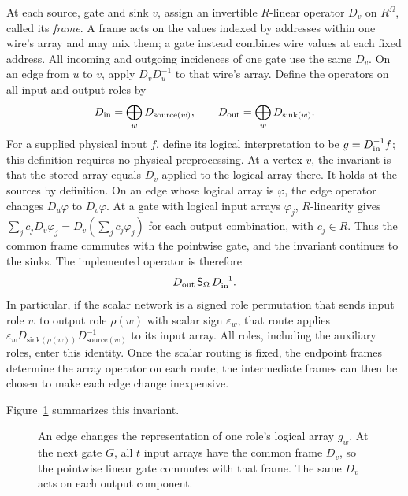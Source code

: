 \documentclass[11pt]{article}
\theoremstyle{definition}
\begin{document}
At each source, gate and sink $v$, assign an invertible $R$-linear operator
$D_v$ on $R^\Omega$, called its \emph{frame}.  A frame acts on the values
indexed by addresses within one wire's array and may mix them; a gate instead
combines wire values at each fixed address.  All incoming and outgoing
incidences of one gate use the same $D_v$.  On an edge from $u$ to $v$, apply
$D_vD_u^{-1}$ to that wire's array.  Define the operators on all input and
output roles by
\[
 D_{\rm in}=\bigoplus_w D_{\mathrm{source}(w)},\qquad
 D_{\rm out}=\bigoplus_w D_{\mathrm{sink}(w)}.
\]
For a supplied physical input $f$, define its logical interpretation to be
$g=D_{\rm in}^{-1}f$; this definition requires no physical preprocessing.
At a vertex $v$, the invariant is that the stored array equals $D_v$ applied
to the logical array there.  It holds at the sources by definition.  On an
edge whose logical array is $\varphi$, the edge operator changes $D_u\varphi$
to $D_v\varphi$.  At a gate with logical input arrays $\varphi_j$,
$R$-linearity gives
$\sum_j c_jD_v\varphi_j=D_v(\sum_j c_j\varphi_j)$ for each output combination, with
$c_j\in R$.  Thus the common frame commutes with the pointwise gate, and
the invariant continues to the sinks.  The implemented operator is therefore
\begin{equation}
 D_{\rm out}\,\mathsf S_\Omega\,D_{\rm in}^{-1}.
 \label{eq:common-frame-identity}
\end{equation}
In particular, if the scalar network is a signed role permutation that
sends input role $w$ to output role $\rho(w)$ with scalar sign
$\varepsilon_w$, that route applies
$\varepsilon_wD_{\mathrm{sink}(\rho(w))}
D_{\mathrm{source}(w)}^{-1}$ to its input array.  All roles, including
the auxiliary roles, enter this identity.  Once the scalar routing is fixed,
the endpoint frames determine the array operator on each route; the
intermediate frames can then be chosen to make each edge change inexpensive.

Figure~\ref{fig:frame-compatibility} summarizes this invariant.
\begin{figure}[ht]
\centering
{}
 \caption{An edge changes the representation of one role's logical array
$g_w$. At the next gate $G$, all $t$ input arrays have the common frame
$D_v$, so the pointwise linear gate commutes with that frame. The same
$D_v$ acts on each output component.}
\label{fig:frame-compatibility}
\end{figure}
\end{document}
